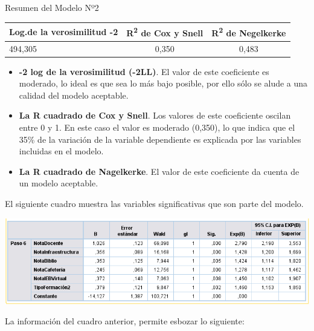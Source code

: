 \documentclass[]{book}
\begin{document}
Resumen del Modelo Nº2

\begin{longtable}[]{@{}lcc@{}}
\toprule
Log.de la verosimilitud -2 & R\textsuperscript{2} de Cox y Snell &
R\textsuperscript{2} de Negelkerke\tabularnewline
\midrule
\endhead
494,305 & 0,350 & 0,483\tabularnewline
\bottomrule
\end{longtable}

\begin{itemize}
\item
  \textbf{-2 log de la verosimilitud (-2LL)}. El valor de este
  coeficiente es moderado, lo ideal es que sea lo más bajo posible, por
  ello sólo se alude a una calidad del modelo aceptable.
\item
  \textbf{La R cuadrado de Cox y Snell}. Los valores de este coeficiente
  oscilan entre 0 y 1. En este caso el valor es moderado (0,350), lo que
  indica que el 35\% de la variación de la variable dependiente es
  explicada por las variables incluidas en el modelo.
\item
  \textbf{La R cuadrado de Nagelkerke}. El valor de este coeficiente da
  cuenta de un modelo aceptable.
\end{itemize}

El siguiente cuadro muestra las variables significativas que son parte
del modelo.

\begin{center}\includegraphics{images/Modelo2} \end{center}

La información del cuadro anterior, permite esbozar lo siguiente:
\end{document}
